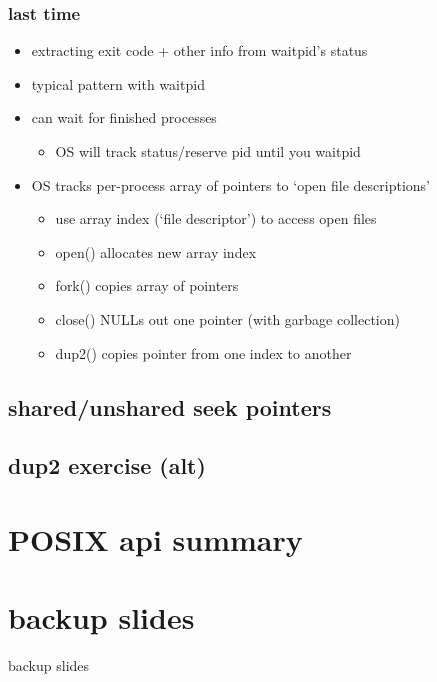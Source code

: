 \date{}
\title{}
\date{}

\begin{frame}
    \titlepage
\end{frame}



\begin{frame}
\frametitle{last time}
    \begin{itemize}
        \item extracting exit code + other info from waitpid's status
        \item typical pattern with waitpid
        \item can wait for finished processes
            \begin{itemize}
            \item OS will track status/reserve pid until you waitpid
            \end{itemize}
        \item OS tracks per-process array of pointers to `open file descriptions'
            \begin{itemize}
            \item use array index (`file descriptor') to access open files
            \item open() allocates new array index
            \item fork() copies array of pointers
            \item close() NULLs out one pointer (with garbage collection)
            \item dup2() copies pointer from one index to another
            \end{itemize}
    \end{itemize}
\end{frame}

\subsection{shared/unshared seek pointers}


\subsection{dup2 exercise (alt)}


\section{POSIX api summary}





\section{backup slides}
\begin{frame}{backup slides}
\end{frame}


